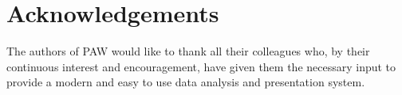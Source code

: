 \section*{Acknowledgements}
 
The authors of PAW would like to thank all their colleagues who, by their
continuous interest and encouragement, have given them the necessary input 
to provide a modern and easy to use data analysis and presentation system.

\newpage
\setcounter{tocdepth}{2}
\tableofcontents
\endinput
